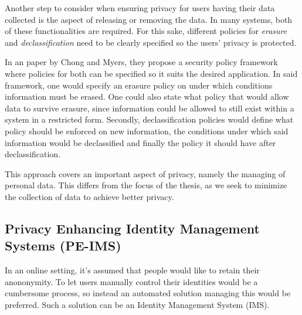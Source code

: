 

Another step to consider when ensuring privacy for users having their data collected is the aspect of releasing or removing the data. In many systems, both of these functionalities are required. For this sake, different policies for \textit{erasure} and \textit{declassification} need to be clearly specified so the users' privacy is protected. 


In an paper by Chong and Myers\cite{chong2005language}, they propose a security policy framework where policies for both can be specified so it suits the desired application. In said framework, one would specify an erasure policy on under which conditions information must be erased. One could also state what policy that would allow data to survive erasure, since information could be allowed to still exist within a system in a restricted form. Secondly, declassification policies would define what policy should be enforced on new information, the conditions under which said information would be declassified and finally the policy it should have after declassification. 


This approach covers an important aspect of privacy, namely the managing of personal data. This differs from the focus of the thesis, as we seek to minimize the collection of data to achieve better privacy. %


\subsection{Privacy Enhancing Identity Management Systems (PE-IMS)}


In an online setting, it's assumed that people would like to retain their anononymity.\cite{hansen2004privacy} To let users manually control their identities would be a cumbersome process, so instead an automated solution managing this would be preferred. Such a solution can be an Identity Management System (IMS).

